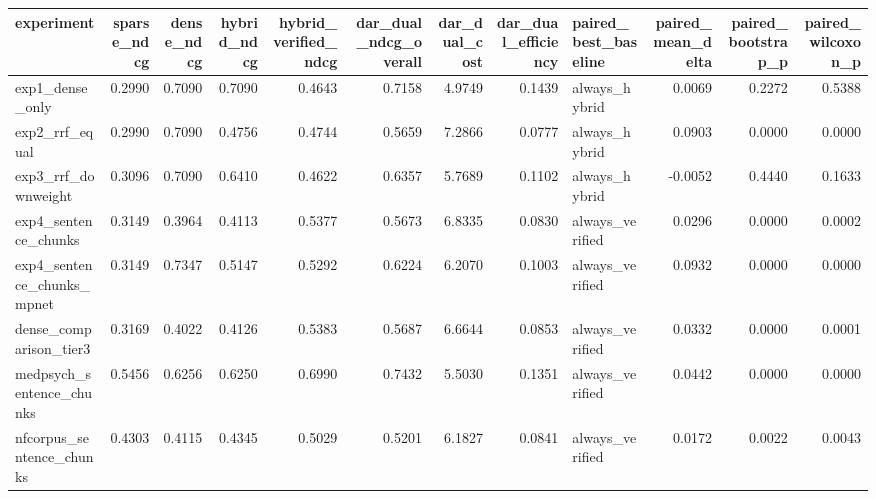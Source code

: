 \begin{tabular}{lrrrrrrrlrrr}
\toprule
experiment & sparse_ndcg & dense_ndcg & hybrid_ndcg & hybrid_verified_ndcg & dar_dual_ndcg_overall & dar_dual_cost & dar_dual_efficiency & paired_best_baseline & paired_mean_delta & paired_bootstrap_p & paired_wilcoxon_p \\
\midrule
exp1_dense_only & 0.2990 & 0.7090 & 0.7090 & 0.4643 & 0.7158 & 4.9749 & 0.1439 & always_hybrid & 0.0069 & 0.2272 & 0.5388 \\
exp2_rrf_equal & 0.2990 & 0.7090 & 0.4756 & 0.4744 & 0.5659 & 7.2866 & 0.0777 & always_hybrid & 0.0903 & 0.0000 & 0.0000 \\
exp3_rrf_downweight & 0.3096 & 0.7090 & 0.6410 & 0.4622 & 0.6357 & 5.7689 & 0.1102 & always_hybrid & -0.0052 & 0.4440 & 0.1633 \\
exp4_sentence_chunks & 0.3149 & 0.3964 & 0.4113 & 0.5377 & 0.5673 & 6.8335 & 0.0830 & always_verified & 0.0296 & 0.0000 & 0.0002 \\
exp4_sentence_chunks_mpnet & 0.3149 & 0.7347 & 0.5147 & 0.5292 & 0.6224 & 6.2070 & 0.1003 & always_verified & 0.0932 & 0.0000 & 0.0000 \\
dense_comparison_tier3 & 0.3169 & 0.4022 & 0.4126 & 0.5383 & 0.5687 & 6.6644 & 0.0853 & always_verified & 0.0332 & 0.0000 & 0.0001 \\
medpsych_sentence_chunks & 0.5456 & 0.6256 & 0.6250 & 0.6990 & 0.7432 & 5.5030 & 0.1351 & always_verified & 0.0442 & 0.0000 & 0.0000 \\
nfcorpus_sentence_chunks & 0.4303 & 0.4115 & 0.4345 & 0.5029 & 0.5201 & 6.1827 & 0.0841 & always_verified & 0.0172 & 0.0022 & 0.0043 \\
\bottomrule
\end{tabular}
